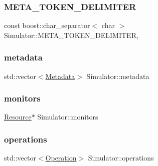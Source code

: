 \hypertarget{class_simulator_a6c36f9f56a6286593ad414bfc9d2d015}{}\label{class_simulator_a6c36f9f56a6286593ad414bfc9d2d015} 
\subsubsection{\texorpdfstring{M\+E\+T\+A\+\_\+\+T\+O\+K\+E\+N\+\_\+\+D\+E\+L\+I\+M\+I\+T\+ER}{META\_TOKEN\_DELIMITER}}
{\footnotesize\ttfamily const boost\+::char\+\_\+separator$<$ char $>$ Simulator\+::\+M\+E\+T\+A\+\_\+\+T\+O\+K\+E\+N\+\_\+\+D\+E\+L\+I\+M\+I\+T\+ER\hspace{0.3cm}{\ttfamily [static]}, {\ttfamily [private]}}

\hypertarget{class_simulator_a4280898fdb4f5e2fe78eba77b7030bbc}{}\label{class_simulator_a4280898fdb4f5e2fe78eba77b7030bbc} 
\subsubsection{\texorpdfstring{metadata}{metadata}}
{\footnotesize\ttfamily std\+::vector$<$\hyperlink{struct_metadata}{Metadata}$>$ Simulator\+::metadata\hspace{0.3cm}{\ttfamily [private]}}

\hypertarget{class_simulator_adc7b9cba44f12566307e77741b6b15db}{}\label{class_simulator_adc7b9cba44f12566307e77741b6b15db} 
\subsubsection{\texorpdfstring{monitors}{monitors}}
{\footnotesize\ttfamily \hyperlink{class_resource}{Resource}$\ast$ Simulator\+::monitors\hspace{0.3cm}{\ttfamily [private]}}

\hypertarget{class_simulator_af0de92f112f7c366965c9c2ab3252e71}{}\label{class_simulator_af0de92f112f7c366965c9c2ab3252e71} 
\subsubsection{\texorpdfstring{operations}{operations}}
{\footnotesize\ttfamily std\+::vector$<$\hyperlink{struct_operation}{Operation}$>$ Simulator\+::operations\hspace{0.3cm}{\ttfamily [private]}}

